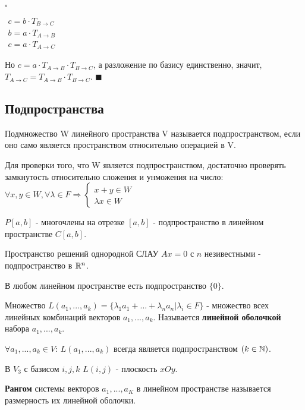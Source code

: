 \documentclass[../main.tex]{subfiles}
\begin{document}
\void $\square$ 

$\begin{matrix} c = b\cdot T_{B\rightarrow C} \\ b = a\cdot T_{A\rightarrow B} \\ c = a\cdot T_{A\rightarrow C} \end{matrix}$

Но $c = a\cdot T_{A\rightarrow B}\cdot T_{B\rightarrow C}$, а разложение по базису единственно, значит, $T_{A\rightarrow C} = T_{A\rightarrow B}\cdot T_{B\rightarrow C}$.
$\blacksquare$

\subsection{Подпространства}

\void{} Подмножество W линейного пространства V называется подпространством, если оно само является пространством относительно
операцией в V.

\void{} Для проверки того, что W является подпространством, достаточно проверять замкнутость относительно
сложения и унможения на число: $\forall x,y\in W, \forall\lambda\in F \Longrightarrow \left\{\begin{matrix}x+y\in W\\ \lambda x\in W\end{matrix}\right.$

\void{}

\void{} $P[a, b]$ - многочлены на отрезке $[a, b]$ - подпространство в линейном 
пространстве $C[a, b]$.

\void{} Пространство решений однородной СЛАУ $Ax = 0$ с $n$ незивестными -
подпространство в $\mathbb{R}^n$.

\void{} В любом линейном пространстве есть подпространство $\{0\}$.

\void{} Множество $L(a_1,...,a_k) = \{\lambda_1 a_1 + ... + \lambda_n a_n \vert \lambda_i\in F\}$ -
множество всех линейных комбинаций векторов $a_1,...,a_k$. Называется \textbf{линейной оболочкой} набора $a_1,...,a_k$.

\void{} $\forall a_1,...,a_k \in V$: $L(a_1,...,a_k)$ всегда является подпространством $(k\in\mathbb{N})$.

\void{} В $V_3$ с базисом $i, j, k$ $L(i, j)$ - плоскость $xOy$.

\void{} \textbf{Рангом} системы векторов $a_1,...,a_K$ в линейном пространстве называется размерность
их линейной оболочки.
\end{document}
